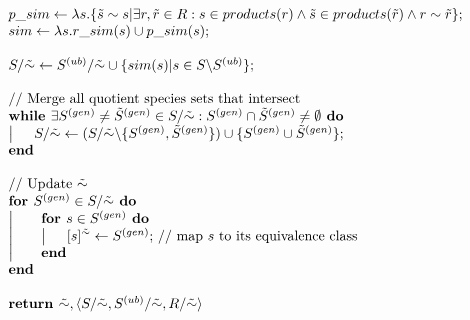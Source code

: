 \documentclass[9pt]{article}
\begin{document}
\[\begin{array}{l}
\mbox{$p\_sim \leftarrow \lambda{s}.\{\tilde{s}\sim{s}|\exists r,\tilde{r}\in{R}: s\in products(r) \land \tilde{s}\in products(\tilde{r}) \land r \sim \tilde{r}\};$}\\
\mbox{$sim \leftarrow \lambda{s}.r\_sim(s)\cup p\_sim(s);$}\\
\mbox{~}\\
\mbox{$S/\tilde{\sim} \leftarrow S^{(ub)}/\tilde{\sim} \cup \{sim(s)|s \in S\backslash S^{(ub)}\};$}\\
\mbox{~}\\
\mbox{// Merge all quotient species sets that intersect}\\
\mbox{\textbf{while }$\exists S^{(gen)} \neq \tilde{S}^{(gen)} \in S/\tilde{\sim}: S^{(gen)} \cap \tilde{S}^{(gen)} \neq \emptyset$\textbf{ do}}\\
\left| \indent\mbox{$S/\tilde{\sim} \leftarrow (S/\tilde{\sim}\backslash{\{S^{(gen)}, \tilde{S}^{(gen)}\}})\cup\{S^{(gen)}\cup \tilde{S}^{(gen)}\};$}\right. \\
\mbox{\textbf{end}}\\
\mbox{~}\\
\mbox{// Update $\tilde{\sim}$}\\
\mbox{\textbf{for }$S^{(gen)}\in{S/\tilde{\sim}}$\textbf{ do}}\\
\left| \indent \begin{array}{l}
\mbox{\textbf{for }$s \in S^{(gen)}$\textbf{ do}}\\
\left| \indent\mbox{$[s]^{\tilde{\sim}} \leftarrow S^{(gen)};$ // map $s$ to its equivalence class}\right. \\
\mbox{\textbf{end}}
\end{array}\right. \\
\mbox{\textbf{end}}\\
\mbox{~}\\
\mbox{\textbf{return }$\tilde{\sim}, \langle S/\tilde{\sim}, S^{(ub)}/\tilde{\sim}, R/\tilde{\sim} \rangle$}
\end{array} \]

\end{document}
